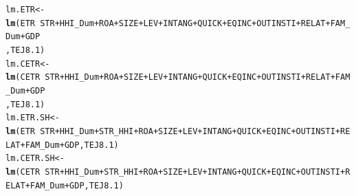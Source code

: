 \documentclass[a4paper,14pt]{article}\usepackage[]{graphicx}\usepackage[]{color}
\makeatletter
\newcommand{\hlopt}[1]{\textcolor[rgb]{0,0,0}{#1}}%
\newcommand{\hlstd}[1]{\textcolor[rgb]{0.345,0.345,0.345}{#1}}%
\newcommand{\hlkwb}[1]{\textcolor[rgb]{0.69,0.353,0.396}{#1}}%
\newcommand{\hlkwd}[1]{\textcolor[rgb]{0.737,0.353,0.396}{\textbf{#1}}}%
\newenvironment{kframe}{%
 \def\at@end@of@kframe{}%
 \ifinner\ifhmode%
  \def\at@end@of@kframe{\end{minipage}}%
  \begin{minipage}{\columnwidth}%
 \fi\fi%
 \def\FrameCommand##1{\hskip\@totalleftmargin \hskip-\fboxsep
 \colorbox{shadecolor}{##1}\hskip-\fboxsep
     \hskip-\linewidth \hskip-\@totalleftmargin \hskip\columnwidth}%
 \MakeFramed {\advance\hsize-\width
   \@totalleftmargin\z@ \linewidth\hsize
   \@setminipage}}%
 {\par\unskip\endMakeFramed%
 \at@end@of@kframe}
\newenvironment{knitrout}{}{} %
\makeatother
\begin{document}
\newpage
\begin{knitrout}
\color{fgcolor}\begin{kframe}
\begin{alltt}
\hlstd{lm.ETR} \hlkwb{<-} \hlkwd{lm}\hlstd{(ETR} \hlopt{~} \hlstd{STR}\hlopt{+}\hlstd{HHI_Dum}\hlopt{+}\hlstd{ROA}\hlopt{+}\hlstd{SIZE}\hlopt{+}\hlstd{LEV}\hlopt{+}\hlstd{INTANG}\hlopt{+}\hlstd{QUICK}\hlopt{+}\hlstd{EQINC}\hlopt{+}\hlstd{OUTINSTI}\hlopt{+}\hlstd{RELAT}\hlopt{+}\hlstd{FAM_Dum}\hlopt{+}\hlstd{GDP}
            \hlstd{,TEJ8.1)}
\hlstd{lm.CETR} \hlkwb{<-} \hlkwd{lm}\hlstd{(CETR} \hlopt{~} \hlstd{STR}\hlopt{+}\hlstd{HHI_Dum}\hlopt{+}\hlstd{ROA}\hlopt{+}\hlstd{SIZE}\hlopt{+}\hlstd{LEV}\hlopt{+}\hlstd{INTANG}\hlopt{+}\hlstd{QUICK}\hlopt{+}\hlstd{EQINC}\hlopt{+}\hlstd{OUTINSTI}\hlopt{+}\hlstd{RELAT}\hlopt{+}\hlstd{FAM_Dum}\hlopt{+}\hlstd{GDP}
             \hlstd{,TEJ8.1)}
\hlstd{lm.ETR.SH} \hlkwb{<-} \hlkwd{lm}\hlstd{(ETR} \hlopt{~} \hlstd{STR}\hlopt{+}\hlstd{HHI_Dum}\hlopt{+}\hlstd{STR_HHI}\hlopt{+}\hlstd{ROA}\hlopt{+}\hlstd{SIZE}\hlopt{+}\hlstd{LEV}\hlopt{+}\hlstd{INTANG}\hlopt{+}\hlstd{QUICK}\hlopt{+}\hlstd{EQINC}\hlopt{+}\hlstd{OUTINSTI}\hlopt{+}\hlstd{RELAT}\hlopt{+}\hlstd{FAM_Dum}\hlopt{+}\hlstd{GDP,TEJ8.1)}
\hlstd{lm.CETR.SH} \hlkwb{<-} \hlkwd{lm}\hlstd{(CETR} \hlopt{~} \hlstd{STR}\hlopt{+}\hlstd{HHI_Dum}\hlopt{+}\hlstd{STR_HHI}\hlopt{+}\hlstd{ROA}\hlopt{+}\hlstd{SIZE}\hlopt{+}\hlstd{LEV}\hlopt{+}\hlstd{INTANG}\hlopt{+}\hlstd{QUICK}\hlopt{+}\hlstd{EQINC}\hlopt{+}\hlstd{OUTINSTI}\hlopt{+}\hlstd{RELAT}\hlopt{+}\hlstd{FAM_Dum}\hlopt{+}\hlstd{GDP,TEJ8.1)}
\end{alltt}
\end{kframe}
\end{knitrout}

\newpage
\end{document}
